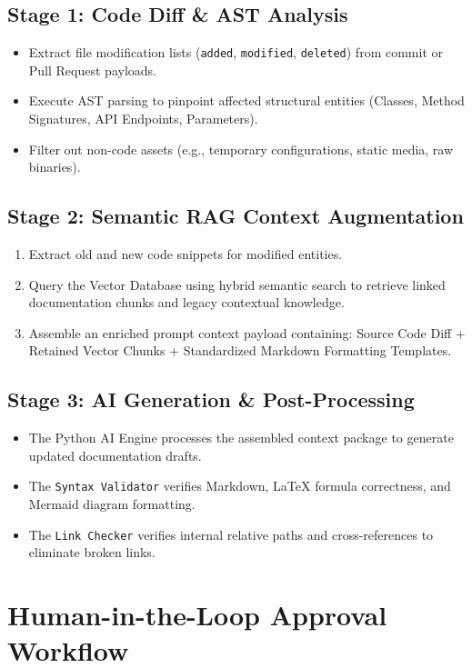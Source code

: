 \subsection{Stage 1: Code Diff \& AST Analysis}
\begin{itemize}
    \item Extract file modification lists (\texttt{added}, \texttt{modified}, \texttt{deleted}) from commit or Pull Request payloads.
    \item Execute AST parsing to pinpoint affected structural entities (Classes, Method Signatures, API Endpoints, Parameters).
    \item Filter out non-code assets (e.g., temporary configurations, static media, raw binaries).
\end{itemize}

\subsection{Stage 2: Semantic RAG Context Augmentation}
\begin{enumerate}
    \item Extract old and new code snippets for modified entities.
    \item Query the Vector Database using hybrid semantic search to retrieve linked documentation chunks and legacy contextual knowledge.
    \item Assemble an enriched prompt context payload containing: Source Code Diff + Retained Vector Chunks + Standardized Markdown Formatting Templates.
\end{enumerate}

\subsection{Stage 3: AI Generation \& Post-Processing}
\begin{itemize}
    \item The Python AI Engine processes the assembled context package to generate updated documentation drafts.
    \item The \texttt{Syntax Validator} verifies Markdown, LaTeX formula correctness, and Mermaid diagram formatting.
    \item The \texttt{Link Checker} verifies internal relative paths and cross-references to eliminate broken links.
\end{itemize}

\section{Human-in-the-Loop Approval Workflow}


